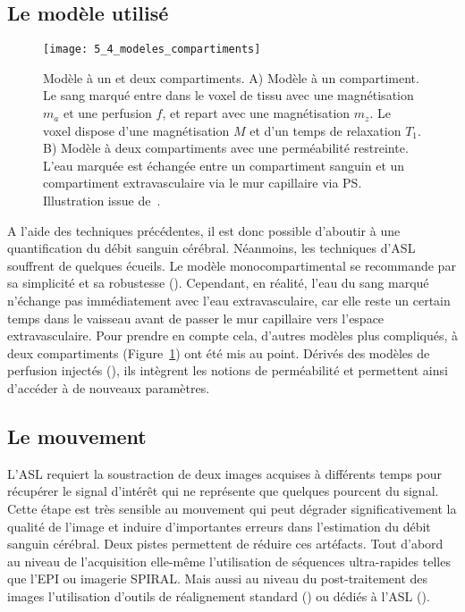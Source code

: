\subsection{Le modèle utilisé}
\begin{figure}[!t]
\centering
\texttt{[image: 5\_4\_modeles\_compartiments]}
\caption{Modèle à un et deux compartiments. A) Modèle à un compartiment. Le sang marqué entre dans le voxel de tissu
avec une magnétisation $m_a$ et une perfusion $f$, et repart avec une magnétisation $m_z$. Le voxel dispose d’une magnétisation
$M$ et d’un temps de relaxation $T_1$. B) Modèle à deux compartiments avec une perméabilité restreinte. L’eau marquée est
échangée entre un compartiment sanguin et un compartiment extravasculaire via le mur capillaire via PS. Illustration issue
de~\cite{Parkes2005}.}
\label{fig:5_4_modeles_compartiments}	
\end{figure}
A l’aide des techniques précédentes, il est donc possible d’aboutir à une quantification du débit
sanguin cérébral. Néanmoins, les techniques d’ASL souffrent de quelques écueils. Le modèle
monocompartimental se recommande par sa simplicité et sa robustesse (\cite{Alsop2014}). Cependant, en réalité,
l’eau du sang marqué n’échange pas immédiatement avec l’eau extravasculaire, car elle reste un
certain temps dans le vaisseau avant de passer le mur capillaire vers l’espace extravasculaire. Pour
prendre en compte cela, d’autres modèles plus compliqués, à deux compartiments (Figure~\ref{fig:5_4_modeles_compartiments}) ont
été mis au point. Dérivés des modèles de perfusion injectés (\cite{Parkes2005}), ils intègrent les notions de
perméabilité et permettent ainsi d’accéder à de nouveaux paramètres.
\subsection{Le mouvement}
L’ASL requiert la soustraction de deux images acquises à différents temps pour récupérer le
signal d’intérêt qui ne représente que quelques pourcent du signal. Cette étape est très sensible au
mouvement qui peut dégrader significativement la qualité de l’image et induire d’importantes erreurs
dans l’estimation du débit sanguin cérébral. Deux pistes permettent de réduire ces artéfacts. Tout
d’abord au niveau de l’acquisition elle-même l’utilisation de séquences ultra-rapides telles que l’EPI ou
imagerie SPIRAL. Mais aussi au niveau du post-traitement des images l’utilisation d’outils de
réalignement standard (\cite{Friston2006}) ou dédiés à l’ASL (\cite{Wang2012}).
